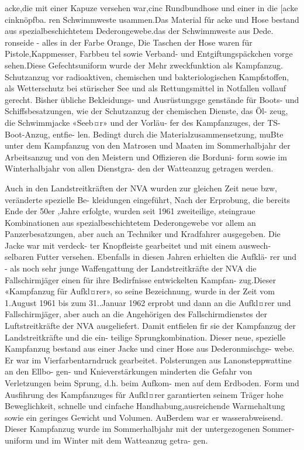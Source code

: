 acke,die mit einer Kapuze versehen war,cinc
Rundbundhose und einer in die [acke cinknöpfba.
ren Schwimmweste usammen.Das Material fǔr
acke und Hose bestand aus spezialbeschichtetem
Dederongewebe.das der Schwimmweste aus Dede.
ronseide - alles in der Farbe Orange, Die Taschen
der Hose waren für Pistole,Kappmesser, Farbbeu
tel sowie Verband- und Entgiftungspäckchen vorge
sehen.Diese Gefechtsuniform wurde der Mehr
zweckfunktion als Kampfanzug. Schutzanzug vor radioaktiven, chemischen und bakteriologischen
Kampfstoffen, als Wetterschutz bei stürischer See
und als Rettungsmittel in Notfallen vollauf gerecht.
Bisher übliche Bekleidungs- und Ausrüstungsge
genstände für Boots- und Schiffsbesatzungen, wie
der Schutzanzug der chemischen Dienste, das Öl-
zeug, die Schwimmjacke «Seeb¤r» und der Vorläu-
fer des Kampfanzuges, der TS-Boot-Anzug, entfie-
len. Bedingt durch die Materialzusammensetzung,
muBte unter dem Kampfanzug von den Matrosen
und Maaten im Sommerhalbjahr der Arbeitsanzug
und von den Meistern und Offizieren die Borduni-
form sowie im Winterhalbjahr von allen Dienstgra-
den der Watteanzug getragen werden.

Auch in den Landstreitkräften der NVA wurden
zur gleichen Zeit neue bzw, veränderte spezielle Be-
kleidungen eingeführt, Nach der Erprobung, die
bereits Ende der 50er ,Jahre erfolgte, wurden seit
1961 zweiteilige, steingraue
Kombinationen aus
spezialbeschichtetem Dederongewebe vor allem an
Panzerbesatzungen, aber auch an Techniker und
Kradfahrer ausgegeben. Die Jacke war mit verdeck-
ter Knopfleiste gearbeitet und mit einem auswech-
selbaren Futter versehen.
Ebenfalls in diesen Jahren erhielten die Aufklä-
rer und - als noch sehr junge Waffengattung der
Landstreitkräfte der NVA die Fallschirmjäger
einen für ihre Bedirfnisse entwickelten Kampfan-
zug.Dieser «Kampfanzug für Aufkl¤rer», so seine
Bezeichnung, wurde in der Zeit vom 1.August 1961
bis zum 31..Januar 1962 erprobt und dann an die
Aufkl¤rer und Fallschirmjäger, aber auch an die
Angehörigen des Fallschirmdienstes der Luftstreitkräfte der NVA ausgeliefert. Damit entfielen fir sie
der Kampfanzug der Landstreitkräfte und die ein-
teilige Sprungkombination.
Dieser neue, spezielle Kampfanzug bestand aus
einer Jacke und ciner Hose aus Dederonmischge-
webe. Er war im Vierfarbentarndruck gearbeitet.
Polsterungen aus Lanonsteppwattine an den Ellbo-
gen- und Knieverstärkungen minderten die Gefahr
von Verletzungen beim Sprung, d.h. beim Aufkom-
men auf dem Erdboden. Form und Ausfihrung des
Kampfanzuges fǔr Aufkl¤rer garantierten seinem
Träger hohe Beweglichkeit, schnelle und cinfache
Handhabung,ausreichende Warmehaltung sowie
ein geringes Gewicht und Volumen. AuBerdem war
er wasserabweisend. Dieser Kampfanzug wurde im Sommerhalbjahr mit der untergezogenen Sommer-
uniform und im Winter mit dem Watteanzug getra-
gen.